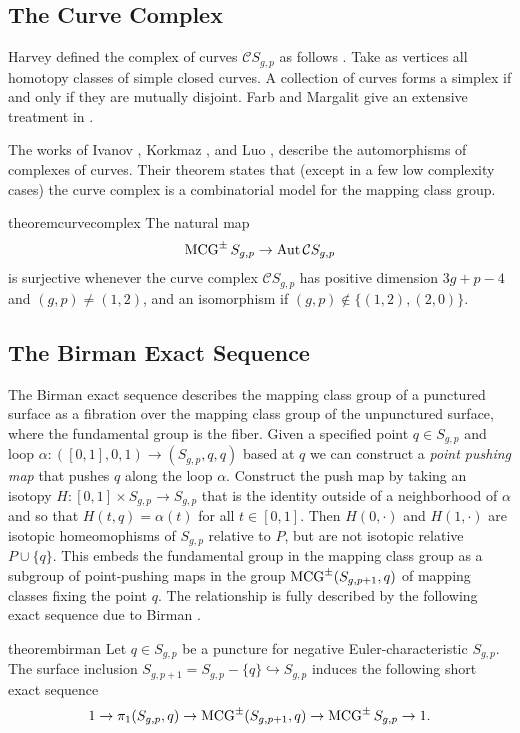 \subsection{The Curve Complex}

Harvey defined the complex of curves $\mathcal C S_{g,p}$ as follows \cite{MR624817}.
Take as vertices all homotopy classes of simple closed curves.
A collection of curves forms a simplex if and only if
they are mutually disjoint.
Farb and Margalit give an extensive treatment in \cite{primer}.

The works of
Ivanov \cite{MR1460387},
Korkmaz \cite{MR1696431},
and
Luo \cite{MR1722024},
describe the automorphisms of complexes of curves.
Their theorem states that (except in a few low complexity cases)
the curve complex is a combinatorial model for the mapping class group.

\begin{restatable}{theorem}{curvecomplex}
  The natural map
  $$
  \operatorname{MCG}^\pm S_{g,p} \to  \operatorname{Aut} \mathcal C S_{g,p}
  $$
  is surjective whenever the curve complex
  $\mathcal C S_{g,p}$
  has positive dimension $3g+p-4$ and $(g,p) \neq (1,2)$,
  and an isomorphism if
  $(g,p) \notin \{(1,2),(2,0)\}.$
  \label{thm:curvecomplex}
\end{restatable}


\subsection{The Birman Exact Sequence}
The Birman exact sequence
describes the
mapping class group of a punctured surface
as a fibration
over the mapping class group of the unpunctured surface,
where the fundamental group is the fiber.
Given a specified point $q \in S_{g,p}$ and loop $\alpha: ([0,1],0,1) \to (S_{g,p},q,q)$ based at $q$
we can construct a \emph{point pushing map} that pushes
$q$ along the loop $\alpha$.
Construct the push map by taking an isotopy $H: [0,1] \times S_{g,p} \to S_{g,p}$
that is the identity outside of a neighborhood of $\alpha$ and so that $H(t,q) =\alpha(t)$ for all $t \in [0,1]$.
Then $H(0,\cdot)$ and $H(1,\cdot)$ are isotopic homeomophisms of $S_{g,p}$ relative to $P$, but are not isotopic relative $P\cup\{q\}$.
This embeds the fundamental group in the mapping class group as a subgroup of point-pushing maps in the group $\operatorname{MCG}^{\pm}(S_{g,p+1},q)$
of mapping classes fixing the point $q$.
The relationship is fully described by the following exact sequence
due to Birman \cite{MR0243519}.

\begin{restatable}{theorem}{birman}
    \label{thm:birman}
  Let $q\in S_{g,p}$ be a puncture for negative Euler-characteristic $S_{g,p}$.
  The surface inclusion
  $S_{g,p+1}=S_{g,p}-\{q\} \hookrightarrow S_{g,p}$
  induces the following short exact sequence
  $$
  1 \to
  \pi_1(S_{g,p},q) \to
  \operatorname{MCG}^{\pm}(S_{g,p+1},q) \to
  \operatorname{MCG}^{\pm}S_{g,p} \to
  1.
  $$
\end{restatable}

